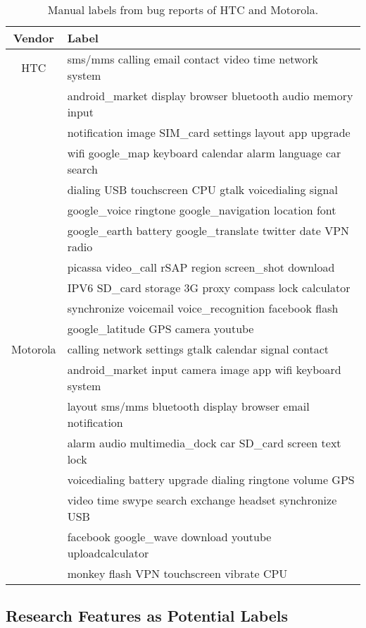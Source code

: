 \documentclass[10pt, conference, compsocconf]{IEEEtran}
\begin{document}
\begin{table}[!t]
\renewcommand{\arraystretch}{1.3}
\caption{Manual labels from bug reports of HTC and Motorola.}
\label{selected1}
\centering
\begin{tabular}{|c||l|}
\hline
Vendor & Label\\
\hline
HTC & sms\//mms calling email contact video time network system\\ 
  & android\_market display browser bluetooth audio memory input\\
  & notification image SIM\_card settings layout app upgrade\\
  & wifi google\_map keyboard calendar alarm language car search\\
  & dialing USB touchscreen CPU gtalk voicedialing signal\\
  & google\_voice ringtone google\_navigation location font\\
  & google\_earth battery google\_translate twitter date VPN radio\\
  & picassa video\_call rSAP region screen\_shot download\\
  & IPV6 SD\_card storage 3G proxy compass lock calculator\\
  & synchronize  voicemail  voice\_recognition facebook  flash\\
  & google\_latitude  GPS camera youtube\\
\hline
Motorola & calling network settings gtalk calendar signal contact\\
    & android\_market input camera image app wifi keyboard system\\
    & layout sms\//mms bluetooth display browser email notification\\
& alarm audio multimedia\_dock car SD\_card screen text lock\\
& voicedialing battery upgrade dialing ringtone volume GPS\\
& video time swype search exchange headset synchronize USB\\
& facebook google\_wave download youtube uploadcalculator\\
& monkey flash VPN touchscreen vibrate CPU\\
\hline
\end{tabular}
\end{table}


\subsection{Research Features as Potential Labels}
\end{document}

